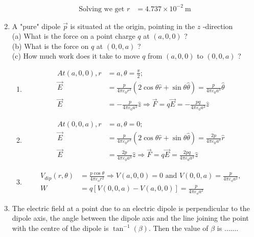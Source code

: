 \begin{enumerate}[label=\color{ocre}\textbf{\arabic*.}]
\begin{answer}
\begin{align*}
		\text{Solving we get }r&=4.737 \times 10^{-2} \mathrm{~m}
		\end{align*}
	\end{answer}
		\item 	 A "pure" dipole $\vec{p}$ is situated at the origin, pointing in the $z$ -direction
	\\(a) What is the force on a point charge $q$ at $(a, 0,0)$ ?
	\\(b) What is the force on $q$ at $(0,0, a)$ ?
	\\(c) How much work does it take to move $q$ from $(a, 0,0)$ to $(0,0, a)$ ?
	\begin{answer}\hspace{0.5cm}
		\begin{enumerate}
			\item \begin{align*}
			A t(a, 0,0), r&=a, \theta=\frac{\pi}{2} ; \\\vec{E}&=\frac{p}{4 \pi \varepsilon_{0} r^{3}}(2 \cos \theta \hat{r}+\sin \theta \hat{\theta})=\frac{p}{4 \pi \varepsilon_{0} a^{3}} \hat{\theta} \\
			\vec{E}&=-\frac{p}{4 \pi \varepsilon_{0} a^{3}} \hat{z} \Rightarrow \vec{F}=q \vec{E}=-\frac{p q}{4 \pi \varepsilon_{0} a^{3}} \hat{z}
			\end{align*}
			\item \begin{align*}
			A t(0,0, a), r&=a, \theta=0 ;\\ \vec{E}&=\frac{p}{4 \pi \varepsilon_{0} r^{3}}(2 \cos \theta \hat{r}+\sin \theta \hat{\theta})=\frac{2 p}{4 \pi \varepsilon_{0} a^{3}} \hat{r} \\
			\vec{E}&=\frac{2 p}{4 \pi \varepsilon_{0} a^{3}} \hat{z} \Rightarrow \vec{F}=q \vec{E}=\frac{2 p q}{4 \pi \varepsilon_{0} a^{3}} \hat{z}
			\end{align*}
			\item \begin{align*}
			V_{d i p}(r, \theta)&=\frac{p \cos \theta}{4 \pi \varepsilon_{o} r^{2}} \Rightarrow V(a, 0,0)=0 \text { and } V(0,0, a)=\frac{p}{4 \pi \varepsilon_{o} a^{2}}, \\
			W&=q[V(0,0, a)-V(a, 0,0)]=\frac{p}{4 \pi \varepsilon_{o} a^{2}}
			\end{align*}
		\end{enumerate}
		
	\end{answer}
\item The electric field at a point due to an electric dipole is perpendicular to the dipole axis, the
angle between the dipole axis and the line joining the point with the centre of the dipole
is $\tan ^{-1}(\beta)$. Then the value of $\beta$ is $\ldots \ldots$.
\begin{answer}
	

\end{answer}
\end{enumerate}
